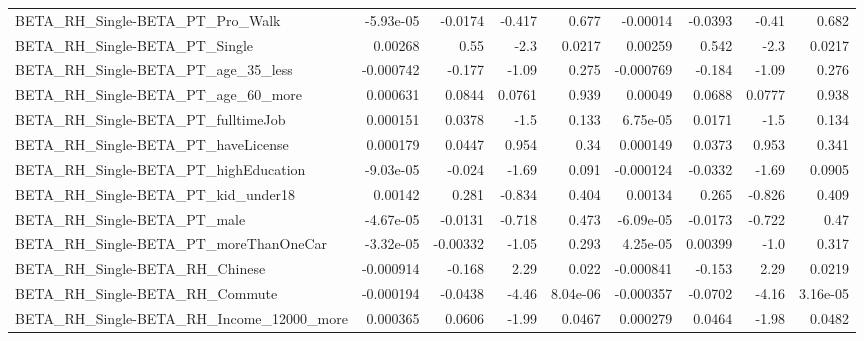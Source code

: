 \begin{tabular}{lrrrrrrrr}
BETA\_RH\_Single-BETA\_PT\_Pro\_Walk                    &   -5.93e-05 &      -0.0174 &    -0.417 &    0.677 &   -0.00014 &     -0.0393 &        -0.41 &         0.682 \\
BETA\_RH\_Single-BETA\_PT\_Single                      &     0.00268 &         0.55 &      -2.3 &   0.0217 &    0.00259 &       0.542 &         -2.3 &        0.0217 \\
BETA\_RH\_Single-BETA\_PT\_age\_35\_less                 &   -0.000742 &       -0.177 &     -1.09 &    0.275 &  -0.000769 &      -0.184 &        -1.09 &         0.276 \\
BETA\_RH\_Single-BETA\_PT\_age\_60\_more                 &    0.000631 &       0.0844 &    0.0761 &    0.939 &    0.00049 &      0.0688 &       0.0777 &         0.938 \\
BETA\_RH\_Single-BETA\_PT\_fulltimeJob                 &    0.000151 &       0.0378 &      -1.5 &    0.133 &   6.75e-05 &      0.0171 &         -1.5 &         0.134 \\
BETA\_RH\_Single-BETA\_PT\_haveLicense                 &    0.000179 &       0.0447 &     0.954 &     0.34 &   0.000149 &      0.0373 &        0.953 &         0.341 \\
BETA\_RH\_Single-BETA\_PT\_highEducation               &   -9.03e-05 &       -0.024 &     -1.69 &    0.091 &  -0.000124 &     -0.0332 &        -1.69 &        0.0905 \\
BETA\_RH\_Single-BETA\_PT\_kid\_under18                 &     0.00142 &        0.281 &    -0.834 &    0.404 &    0.00134 &       0.265 &       -0.826 &         0.409 \\
BETA\_RH\_Single-BETA\_PT\_male                        &   -4.67e-05 &      -0.0131 &    -0.718 &    0.473 &  -6.09e-05 &     -0.0173 &       -0.722 &          0.47 \\
BETA\_RH\_Single-BETA\_PT\_moreThanOneCar              &   -3.32e-05 &     -0.00332 &     -1.05 &    0.293 &   4.25e-05 &     0.00399 &         -1.0 &         0.317 \\
BETA\_RH\_Single-BETA\_RH\_Chinese                     &   -0.000914 &       -0.168 &      2.29 &    0.022 &  -0.000841 &      -0.153 &         2.29 &        0.0219 \\
BETA\_RH\_Single-BETA\_RH\_Commute                     &   -0.000194 &      -0.0438 &     -4.46 & 8.04e-06 &  -0.000357 &     -0.0702 &        -4.16 &      3.16e-05 \\
BETA\_RH\_Single-BETA\_RH\_Income\_12000\_more           &    0.000365 &       0.0606 &     -1.99 &   0.0467 &   0.000279 &      0.0464 &        -1.98 &        0.0482 \\

\end{tabular}
